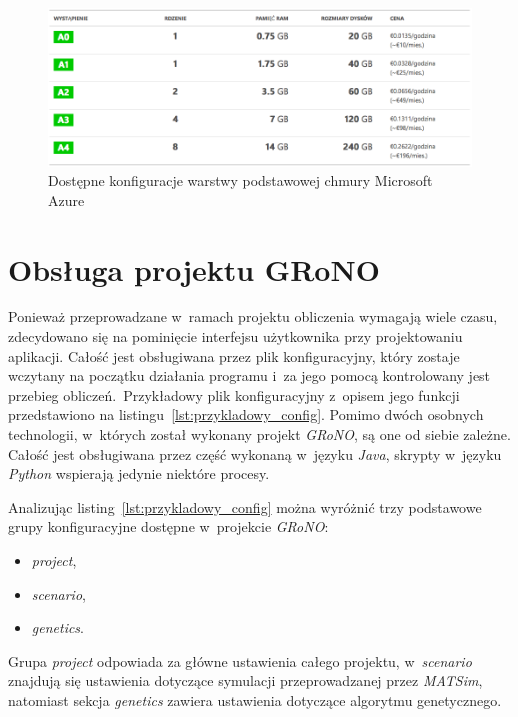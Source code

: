 \documentclass[twoside,12pt]{report}
\begin{document}
\begin{figure}[htbp]
	\centering
	\includegraphics[width=\textwidth]{img/azure_opcje}
	\caption{Dostępne konfiguracje warstwy podstawowej chmury Microsoft Azure}
	\label{fig:azure_dostepne_opcje}
\end{figure}

\section{Obsługa projektu GRoNO}\label{rozdz.konfiguracja_GRoNO}
Ponieważ przeprowadzane w~ramach projektu obliczenia wymagają wiele czasu, zdecydowano się na pominięcie interfejsu użytkownika przy projektowaniu aplikacji. Całość jest obsługiwana przez plik konfiguracyjny, który zostaje wczytany na początku działania programu i~za jego pomocą kontrolowany jest przebieg obliczeń.~Przykładowy plik konfiguracyjny z~opisem jego funkcji przedstawiono na listingu~\ref{lst:przykladowy_config}. Pomimo dwóch osobnych technologii, w~których został wykonany projekt \textit{GRoNO}, są one od siebie zależne. Całość jest obsługiwana przez część wykonaną  w~języku \textit{Java}, skrypty w~języku \textit{Python} wspierają jedynie niektóre procesy. 

 

Analizując listing~\ref{lst:przykladowy_config} można wyróżnić trzy podstawowe grupy konfiguracyjne dostępne w~projekcie \textit{GRoNO}:
\begin{itemize}
\item \textit{project},
\item \textit{scenario},
\item \textit{genetics}.
\end{itemize}

Grupa \textit{project} odpowiada za główne ustawienia całego projektu, w~\textit{scenario} znajdują się ustawienia dotyczące symulacji przeprowadzanej przez \textit{MATSim}, natomiast sekcja \textit{genetics} zawiera ustawienia dotyczące algorytmu genetycznego.
\end{document}
